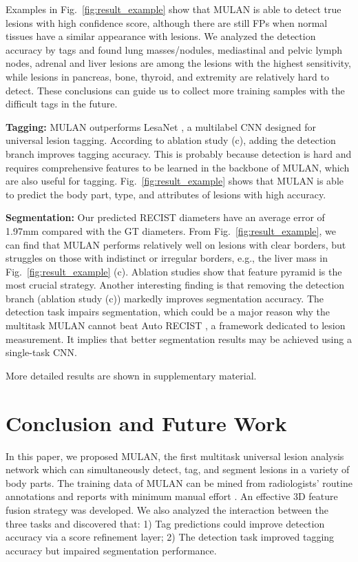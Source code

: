 \documentclass[runningheads]{llncs}
\def\Fig#1{{Fig.\ \ref{fig:#1}}}
\begin{document}
Examples in \Fig{result_example} show that MULAN is able to detect true lesions with high confidence score, although there are still FPs when normal tissues have a similar appearance with lesions. We analyzed the detection accuracy by tags and found lung masses/nodules, mediastinal and pelvic lymph nodes, adrenal and liver lesions are among the lesions with the highest sensitivity, while lesions in pancreas, bone, thyroid, and extremity are relatively hard to detect. These conclusions can guide us to collect more training samples with the difficult tags in the future.

\textbf{Tagging:} MULAN outperforms LesaNet \cite{Yan2019Lesa}, a multilabel CNN designed for universal lesion tagging. According to ablation study (c), adding the detection branch improves tagging accuracy. This is probably because detection is hard and requires comprehensive features to be learned in the backbone of MULAN, which are also useful for tagging. \Fig{result_example} shows that MULAN is able to predict the body part, type, and attributes of lesions with high accuracy.

\textbf{Segmentation:} Our predicted RECIST diameters have an average error of 1.97mm compared with the GT diameters. From \Fig{result_example}, we can find that MULAN performs relatively well on lesions with clear borders, but struggles on those with indistinct or irregular borders, e.g., the liver mass in \Fig{result_example} (c). Ablation studies show that feature pyramid is the most crucial strategy. Another interesting finding is that removing the detection branch (ablation study (c)) markedly improves segmentation accuracy. The detection task impairs segmentation, which could be a major reason why the multitask MULAN cannot beat Auto RECIST \cite{Tang2018RECIST}, a framework dedicated to lesion measurement. It implies that better segmentation results may be achieved using a single-task CNN.

More detailed results are shown in supplementary material.

\section{Conclusion and Future Work}

In this paper, we proposed MULAN, the first multitask universal lesion analysis network which can simultaneously detect, tag, and segment lesions in a variety of body parts. The training data of MULAN can be mined from radiologists' routine annotations and reports with minimum manual effort \cite{Yan2018DeepLesion}. An effective 3D feature fusion strategy was developed. We also analyzed the interaction between the three tasks and discovered that: 1) Tag predictions could improve detection accuracy via a score refinement layer; 2) The detection task improved tagging accuracy but impaired segmentation performance.
\end{document}
